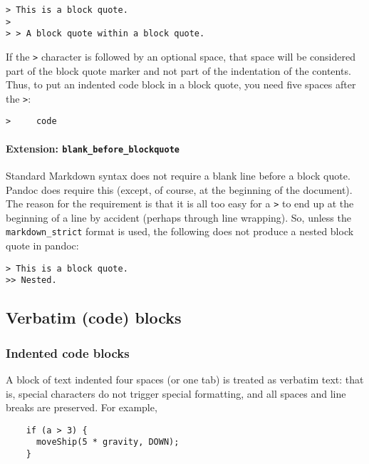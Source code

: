 \documentclass[]{article}
\let\oldparagraph\paragraph
\renewcommand{\paragraph}[1]{\oldparagraph{#1}\mbox{}}
\begin{document}
\begin{verbatim}
> This is a block quote.
>
> > A block quote within a block quote.
\end{verbatim}

If the \texttt{\textgreater{}} character is followed by an optional
space, that space will be considered part of the block quote marker and
not part of the indentation of the contents. Thus, to put an indented
code block in a block quote, you need five spaces after the
\texttt{\textgreater{}}:

\begin{verbatim}
>     code
\end{verbatim}

\paragraph{\texorpdfstring{Extension:
\texttt{blank\_before\_blockquote}}{Extension: blank\_before\_blockquote}}\label{extension-blank_before_blockquote}

Standard Markdown syntax does not require a blank line before a block
quote. Pandoc does require this (except, of course, at the beginning of
the document). The reason for the requirement is that it is all too easy
for a \texttt{\textgreater{}} to end up at the beginning of a line by
accident (perhaps through line wrapping). So, unless the
\texttt{markdown\_strict} format is used, the following does not produce
a nested block quote in pandoc:

\begin{verbatim}
> This is a block quote.
>> Nested.
\end{verbatim}

\subsection{Verbatim (code) blocks}\label{verbatim-code-blocks}

\subsubsection{Indented code blocks}\label{indented-code-blocks}

A block of text indented four spaces (or one tab) is treated as verbatim
text: that is, special characters do not trigger special formatting, and
all spaces and line breaks are preserved. For example,

\begin{verbatim}
    if (a > 3) {
      moveShip(5 * gravity, DOWN);
    }
\end{verbatim}
\end{document}
